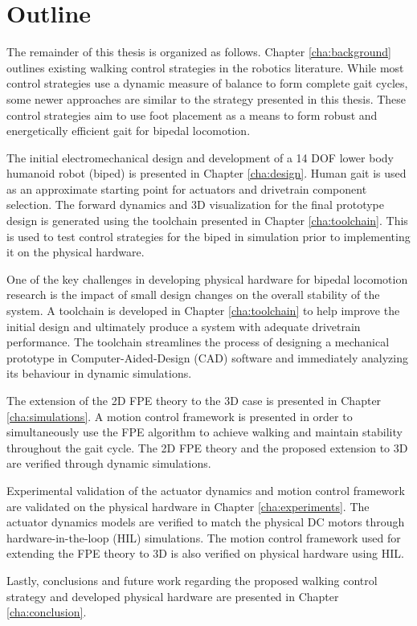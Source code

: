 \section{Outline} %
\label{sec:outline}
The remainder of this thesis is organized as follows. Chapter \ref{cha:background} outlines existing walking control strategies in the robotics literature. While most control strategies use a dynamic measure of balance to form complete gait cycles, some newer approaches are similar to the strategy presented in this thesis. These control strategies aim to use foot placement as a means to form robust and energetically efficient gait for bipedal locomotion. 

The initial electromechanical design and development of a 14 DOF lower body humanoid robot (biped) is presented in Chapter \ref{cha:design}. Human gait is used as an approximate starting point for actuators and drivetrain component selection. The forward dynamics and 3D visualization for the final prototype design is generated using the toolchain presented in Chapter \ref{cha:toolchain}. This is used to test control strategies for the biped in simulation prior to implementing it on the physical hardware.

One of the key challenges in developing physical hardware for bipedal locomotion research is the impact of small design changes on the overall stability of the system. A toolchain is developed in Chapter \ref{cha:toolchain} to help improve the initial design and ultimately produce a system with adequate drivetrain performance. The toolchain streamlines the process of designing a mechanical prototype in Computer-Aided-Design (CAD) software and immediately analyzing its behaviour in dynamic simulations.

The extension of the 2D FPE theory to the 3D case is presented in Chapter \ref{cha:simulations}. A motion control framework is presented in order to simultaneously use the FPE algorithm to achieve walking and maintain stability throughout the gait cycle. The 2D FPE theory and the proposed extension to 3D are verified through dynamic simulations. 

Experimental validation of the actuator dynamics and motion control framework are validated on the physical hardware in Chapter \ref{cha:experiments}. The actuator dynamics models are verified to match the physical DC motors through hardware-in-the-loop (HIL) simulations. The motion control framework used for extending the FPE theory to 3D is also verified on physical hardware using HIL.  

Lastly, conclusions and future work regarding the proposed walking control strategy and developed physical hardware are presented in Chapter \ref{cha:conclusion}. 


